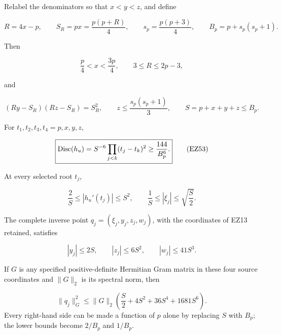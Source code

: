 \begin{theorem}
\label{thm:hard-prime-bounds}
Relabel the denominators so that \(x<y<z\), and define

\begin{equation}
 R=4x-p,\qquad S_R=px=\frac{p(p+R)}4,\qquad
 s_p=\frac{p(p+3)}4,\qquad
 B_p=p+s_p(s_p+1).                                   \tag{EZ50}
\end{equation}

Then

\begin{equation}
 \frac p4<x<\frac{3p}4,\qquad 3\le R\le2p-3,          \tag{EZ51}
\end{equation}

and

\begin{equation}
 (Ry-S_R)(Rz-S_R)=S_R^2,\qquad
 z\le\frac{s_p(s_p+1)}3,\qquad
 S=p+x+y+z\le B_p.                                   \tag{EZ52}
\end{equation}

For \(t_1,t_2,t_3,t_4=p,x,y,z\),

\begin{equation}
 \boxed{\operatorname{Disc}(h_u)
 =S^{-6}\prod_{j<k}(t_j-t_k)^2
 \ge\frac{144}{B_p^6}.}                              \tag{EZ53}
\end{equation}

At every selected root \(t_j\),

\begin{equation}
 \frac2S\le |h_u'(t_j)|\le S^2,\qquad
 \frac1S\le|\xi_j|\le\sqrt{\frac S2}.                \tag{EZ54}
\end{equation}

The complete inverse point \(q_j=(\xi_j,y_j,z_j,w_j)\), with the coordinates
of EZ13 retained, satisfies

\begin{equation}
 |y_j|\le2S,\qquad |z_j|\le6S^2,\qquad |w_j|\le41S^3. \tag{EZ55}
\end{equation}

If \(G\) is any specified positive-definite Hermitian Gram matrix in these
four source coordinates and \(\|G\|_2\) is its spectral norm, then

\begin{equation}
 \boxed{
 \|q_j\|_G^2\le\|G\|_2
 \left(\frac S2+4S^2+36S^4+1681S^6\right).}          \tag{EZ56}
\end{equation}
Every right-hand side can be made a function of \(p\) alone by replacing
\(S\) with \(B_p\); the lower bounds become \(2/B_p\) and \(1/B_p\).
\end{theorem}

